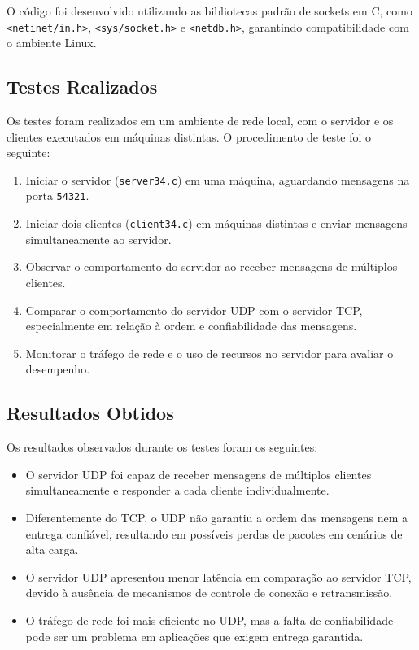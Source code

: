 \documentclass{article}
\begin{document}
O código foi desenvolvido utilizando as bibliotecas padrão de sockets em C, como \texttt{<netinet/in.h>}, \texttt{<sys/socket.h>} e \texttt{<netdb.h>}, garantindo compatibilidade com o ambiente Linux.

\subsection{Testes Realizados}

Os testes foram realizados em um ambiente de rede local, com o servidor e os clientes executados em máquinas distintas. O procedimento de teste foi o seguinte:

\begin{enumerate}
    \item Iniciar o servidor (\texttt{server34.c}) em uma máquina, aguardando mensagens na porta \texttt{54321}.
    \item Iniciar dois clientes (\texttt{client34.c}) em máquinas distintas e enviar mensagens simultaneamente ao servidor.
    \item Observar o comportamento do servidor ao receber mensagens de múltiplos clientes.
    \item Comparar o comportamento do servidor UDP com o servidor TCP, especialmente em relação à ordem e confiabilidade das mensagens.
    \item Monitorar o tráfego de rede e o uso de recursos no servidor para avaliar o desempenho.
\end{enumerate}

\subsection{Resultados Obtidos}

Os resultados observados durante os testes foram os seguintes:

\begin{itemize}
    \item O servidor UDP foi capaz de receber mensagens de múltiplos clientes simultaneamente e responder a cada cliente individualmente.
    \item Diferentemente do TCP, o UDP não garantiu a ordem das mensagens nem a entrega confiável, resultando em possíveis perdas de pacotes em cenários de alta carga.
    \item O servidor UDP apresentou menor latência em comparação ao servidor TCP, devido à ausência de mecanismos de controle de conexão e retransmissão.
    \item O tráfego de rede foi mais eficiente no UDP, mas a falta de confiabilidade pode ser um problema em aplicações que exigem entrega garantida.
\end{itemize}
\end{document}
